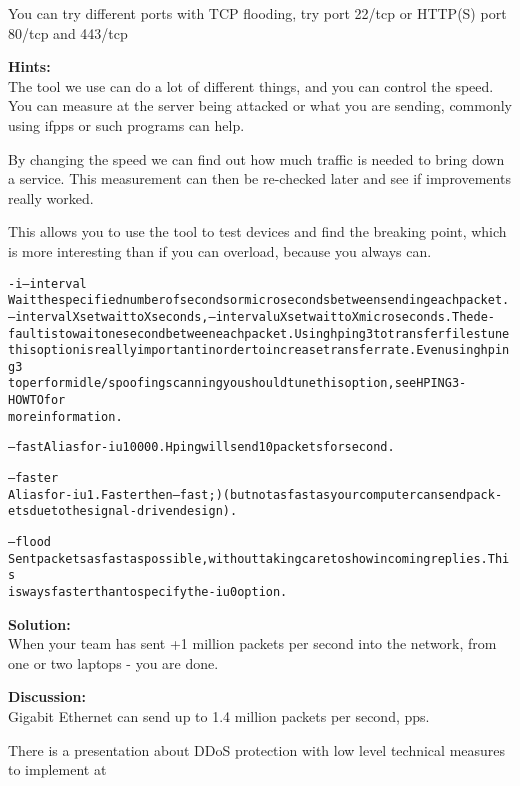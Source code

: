 \documentclass[a4paper,11pt,notitlepage]{report}
\begin{document}
You can try different ports with TCP flooding, try port 22/tcp or HTTP(S) port 80/tcp and 443/tcp


{\bf Hints:}\\
The tool we use can do a lot of different things, and you can control the speed. You can measure at the server being attacked or what you are sending, commonly using ifpps or such programs can help.

By changing the speed we can find out how much traffic is needed to bring down a service. This measurement can then be re-checked later and see if improvements really worked.

This allows you to use the tool to test devices and find the breaking point, which is more interesting than if you can overload, because you always can.
\begin{alltt}\footnotesize
-i --interval
       Wait  the  specified  number  of  seconds or micro seconds between sending each packet.
       --interval X set wait to X seconds, --interval uX set wait to X micro seconds.  The de‐
       fault  is  to  wait one second between each packet. Using hping3 to transfer files tune
       this option is really important in order to increase transfer rate. Even  using  hping3
       to  perform  idle/spoofing  scanning  you should tune this option, see HPING3-HOWTO for
       more information.

--fast Alias for -i u10000. Hping will send 10 packets for second.

--faster
       Alias for -i u1. Faster then --fast ;) (but not as fast as your computer can send pack‐
       ets due to the signal-driven design).

--flood
       Sent  packets  as fast as possible, without taking care to show incoming replies.  This
       is ways faster than to specify the -i u0 option.
\end{alltt}

{\bf Solution:}\\
When your team has sent +1 million packets per second into the network, from one or two laptops - you are done.

{\bf Discussion:}\\
Gigabit Ethernet can send up to 1.4 million packets per second, pps.

There is a presentation about DDoS protection with low level technical measures to implement at\\
{\footnotesize {}}
\end{document}
